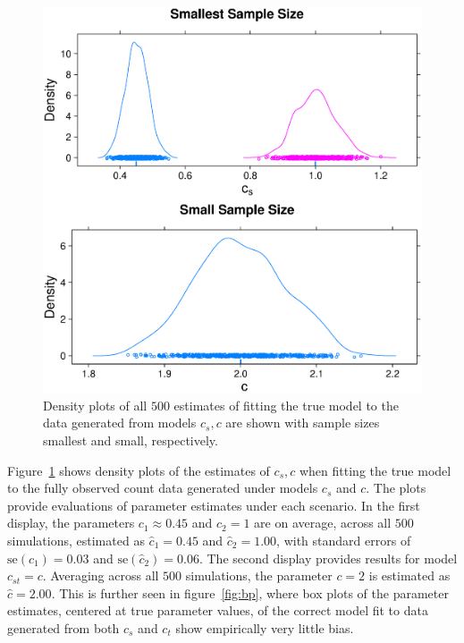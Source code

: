 \begin{figure}
  \centering
  \includegraphics[scale=0.5]{nonem}
  \caption{Density plots of all $500$ estimates of fitting the true model to the data generated from models $c_s,c$ are shown with sample sizes smallest and small, respectively.}
  \label{fig:nonem}
\end{figure}

Figure~\ref{fig:nonem} shows density plots of the estimates of $c_s, c$ when fitting the true model to the fully observed count data generated under models $c_s$ and $c$.  The plots provide evaluations of parameter estimates under each scenario.  In the first display, the parameters $c_1 \approx 0.45$ and $c_2 = 1$ are on average, across all $500$ simulations, estimated as $\hat{c}_1 = 0.45$ and $\hat{c}_2 = 1.00$, with standard errors of $\text{se}(\hat{c}_1) = 0.03$ and $\text{se}(\hat{c}_2) = 0.06$.  The second display provides results for model $c_{st} = c$.  Averaging across all $500$ simulations, the parameter $c=2$ is estimated as $\hat{c} = 2.00$.  This is further seen in figure~\ref{fig:bp}, where box plots of the parameter estimates, centered at true parameter values, of the correct model fit to data generated from both $c_s$ and $c_t$ show empirically very little bias.

